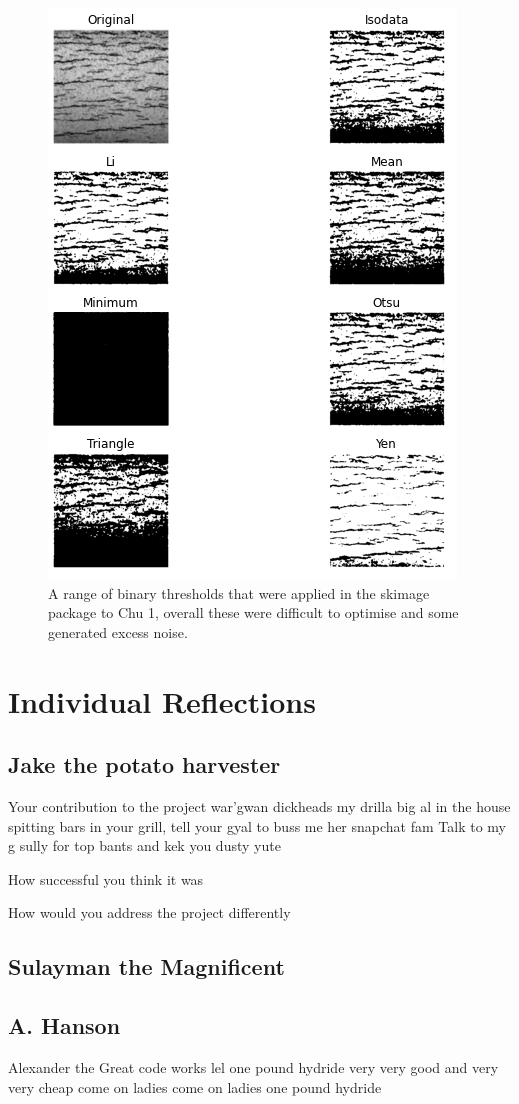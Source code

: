 \documentclass{article}
\begin{document}
\begin{figure}[h]
	    \centering
	    \includegraphics[scale=0.7]{Figures/skimage_thresholds.png}
	    \caption{A range of binary thresholds that were applied in the skimage package to Chu 1, overall these were difficult to optimise and some generated excess noise.}
	    \label{fig:skimage_threshold}
	\end{figure}
	
\section{Individual Reflections}
\subsection{Jake the potato harvester}
Your contribution to the project
war'gwan dickheads my drilla big al in the house spitting bars in your grill, tell your gyal to buss me her snapchat fam
Talk to my g sully for top bants and kek you dusty yute

How successful you think it was

How would you address the project differently
\subsection{Sulayman the Magnificent}

\subsection{A. Hanson}
Alexander the Great
code works
lel
one pound hydride
very very good and very very cheap
come on ladies
come on ladies
one pound hydride
\end{document}
